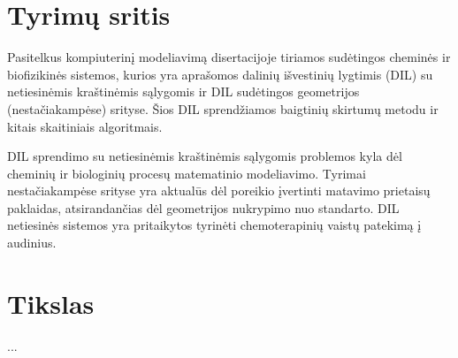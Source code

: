 
\pagestyle{plain}


\section*{Tyrimų sritis}

Pasitelkus kompiuterinį modeliavimą disertacijoje tiriamos su\-dė\-tin\-gos cheminės ir biofizikinės sistemos, kurios yra aprašomos dalinių išvestinių lygtimis (DIL) su netiesinėmis kraštinėmis sąlygomis ir DIL sudėtingos geometrijos (nestačiakampėse) srityse. Šios DIL sprendžiamos baigtinių skirtumų metodu ir kitais skaitiniais algoritmais. 


DIL sprendimo su netiesinėmis kraštinėmis sąlygomis problemos kyla dėl cheminių ir biologinių procesų matematinio modeliavimo. 
Tyrimai nestačiakampėse srityse yra aktualūs dėl poreikio įvertinti matavimo prietaisų paklaidas, atsirandančias dėl geometrijos nukrypimo nuo standarto.
DIL netiesinės sistemos yra pritaikytos tyrinėti chemoterapinių vaistų patekimą į audinius.




\section*{Tikslas}

...

